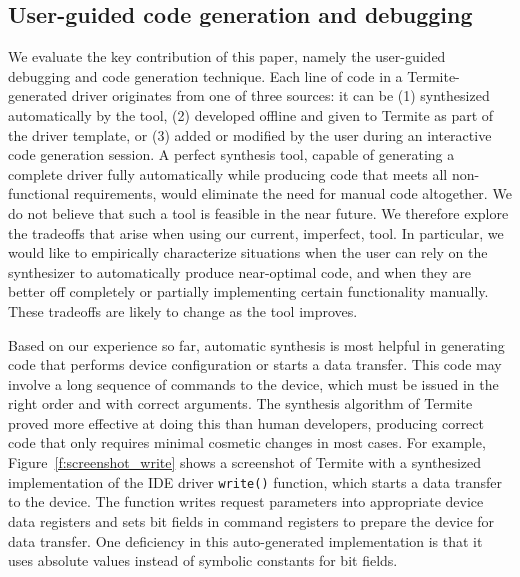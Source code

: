 \documentclass{book}
\newcommand{\termite}{Termite\xspace}
\theoremstyle{definition}
\newcommand{\src}[1]{\texttt{\small #1}}
\begin{document}

\subsection{User-guided code generation and debugging} 
We evaluate the key contribution of this paper, namely the user-guided debugging and code generation technique.  Each line of code in a \termite-generated driver originates from one of three sources: it can be (1) synthesized automatically by the tool, (2) developed offline and given to \termite as part of the driver template, or (3) added or modified by the user during an interactive code generation session.  A perfect synthesis tool, capable of generating a complete driver fully automatically while producing code that meets all non-functional requirements, would eliminate the need for manual code altogether.  We do not believe that such a tool is feasible in the near future.  We therefore explore the tradeoffs that arise when using our current, imperfect, tool.  In particular, we would like to empirically characterize situations when the user can rely on the synthesizer to automatically produce near-optimal code, and when they are better off completely or partially implementing certain functionality manually.  These tradeoffs are likely to change as the tool improves.

Based on our experience so far, automatic synthesis is most helpful in generating code that performs device configuration or starts a data transfer.  This code may involve a long sequence of commands to the device, which must be issued in the right order and with correct arguments.  The synthesis algorithm of \termite proved more effective at doing this than human developers, producing correct code that only requires minimal cosmetic changes in most cases.  For example, Figure~\ref{f:screenshot_write} shows a screenshot of \termite with a synthesized implementation of the IDE driver \src{write()} function, which starts a data transfer to the device.  The function writes request parameters into appropriate device data registers and sets bit fields in command registers to prepare the device for data transfer.  One deficiency in this auto-generated implementation is that it uses absolute values instead of symbolic constants for bit fields.
\end{document}
